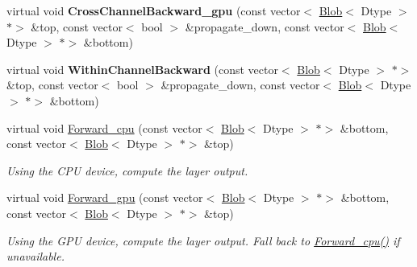 \begin{DoxyCompactItemize}
\mbox{\label{classcaffe_1_1_l_r_n_layer_a9440436b087c68fa9a57184db675568c}} 
virtual void {\bfseries Cross\+Channel\+Backward\+\_\+gpu} (const vector$<$ \mbox{\hyperlink{classcaffe_1_1_blob}{Blob}}$<$ Dtype $>$ $\ast$$>$ \&top, const vector$<$ bool $>$ \&propagate\+\_\+down, const vector$<$ \mbox{\hyperlink{classcaffe_1_1_blob}{Blob}}$<$ Dtype $>$ $\ast$$>$ \&bottom)
\item 
\mbox{\label{classcaffe_1_1_l_r_n_layer_aa2d2f6300ea2d3ecdea716bb38299bf1}} 
virtual void {\bfseries Within\+Channel\+Backward} (const vector$<$ \mbox{\hyperlink{classcaffe_1_1_blob}{Blob}}$<$ Dtype $>$ $\ast$$>$ \&top, const vector$<$ bool $>$ \&propagate\+\_\+down, const vector$<$ \mbox{\hyperlink{classcaffe_1_1_blob}{Blob}}$<$ Dtype $>$ $\ast$$>$ \&bottom)
\item 
\mbox{\label{classcaffe_1_1_l_r_n_layer_a339f364e8955b8c130d5fff41b3cd3a6}} 
virtual void \mbox{\hyperlink{classcaffe_1_1_l_r_n_layer_a339f364e8955b8c130d5fff41b3cd3a6}{Forward\+\_\+cpu}} (const vector$<$ \mbox{\hyperlink{classcaffe_1_1_blob}{Blob}}$<$ Dtype $>$ $\ast$$>$ \&bottom, const vector$<$ \mbox{\hyperlink{classcaffe_1_1_blob}{Blob}}$<$ Dtype $>$ $\ast$$>$ \&top)
\begin{DoxyCompactList}\small\item\em Using the C\+PU device, compute the layer output. \end{DoxyCompactList}\item 
\mbox{\label{classcaffe_1_1_l_r_n_layer_a7bc44b9640ef0f24e393f77f35df1abb}} 
virtual void \mbox{\hyperlink{classcaffe_1_1_l_r_n_layer_a7bc44b9640ef0f24e393f77f35df1abb}{Forward\+\_\+gpu}} (const vector$<$ \mbox{\hyperlink{classcaffe_1_1_blob}{Blob}}$<$ Dtype $>$ $\ast$$>$ \&bottom, const vector$<$ \mbox{\hyperlink{classcaffe_1_1_blob}{Blob}}$<$ Dtype $>$ $\ast$$>$ \&top)
\begin{DoxyCompactList}\small\item\em Using the G\+PU device, compute the layer output. Fall back to \mbox{\hyperlink{classcaffe_1_1_l_r_n_layer_a48782b435dbe9f6caba856521d4ea322}{Forward\+\_\+cpu()}} if unavailable. \end{DoxyCompactList}\item 
\mbox{\label{classcaffe_1_1_l_r_n_layer_a6d83c9f40b7504e16909b72b3f35f620}} 

\end{DoxyCompactItemize}
